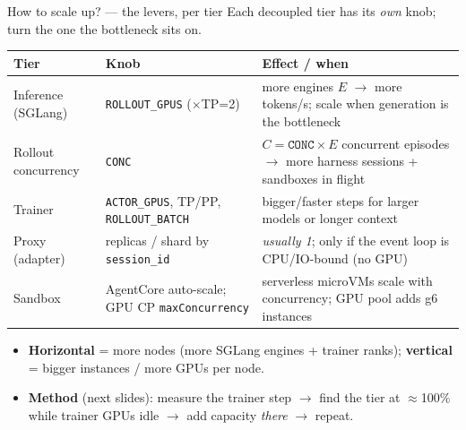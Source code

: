 \documentclass[aspectratio=169]{beamer}
\begin{document}
\begin{frame}{How to scale up? --- the levers, per tier}
  \footnotesize Each decoupled tier has its \emph{own} knob; turn the one the bottleneck sits on.
  \vspace{0.15em}
  \begin{center}\scriptsize
  \renewcommand{\arraystretch}{1.25}
  \begin{tabular}{@{}p{2.5cm}p{3.4cm}p{5.0cm}@{}}
    \toprule
    \textbf{Tier} & \textbf{Knob} & \textbf{Effect / when} \\
    \midrule
    Inference (SGLang) & \texttt{ROLLOUT\_GPUS} ($\times$TP=2) & more engines $E$ $\to$ more tokens/s; scale when generation is the bottleneck \\
    Rollout concurrency & \texttt{CONC} & $C=\texttt{CONC}\times E$ concurrent episodes $\to$ more harness sessions + sandboxes in flight \\
    Trainer & \texttt{ACTOR\_GPUS}, TP/PP, \texttt{ROLLOUT\_BATCH} & bigger/faster steps for larger models or longer context \\
    Proxy (adapter) & replicas / shard by \texttt{session\_id} & \emph{usually 1}; only if the event loop is CPU/IO-bound (no GPU) \\
    Sandbox & AgentCore auto-scale; GPU CP \texttt{maxConcurrency} & serverless microVMs scale with concurrency; GPU pool adds g6 instances \\
    \bottomrule
  \end{tabular}
  \end{center}
  \vspace{0.1em}
  \begin{itemize}\setlength\itemsep{0.1em}
    \item \textbf{Horizontal} = more nodes (more SGLang engines + trainer ranks); \textbf{vertical} = bigger instances / more GPUs per node.
    \item \textbf{Method} (next slides): measure the trainer step $\to$ find the tier at $\approx$100\% while trainer GPUs idle $\to$ add capacity \emph{there} $\to$ repeat.
  \end{itemize}
\end{frame}
\end{document}
